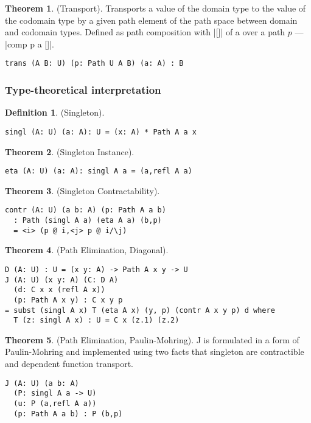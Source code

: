 \documentclass[twoside]{article}
\theoremstyle{definition}
\newtheorem{theorem}{Theorem}
\newtheorem{definition}{Definition}
\begin{document}
\begin{theorem} (Transport).
Transports a value of the domain type to the value of the codomain type
by a given path element of the path space between domain and codomain types.
Defined as path composition with |[]| of a over a path $p$ --- |comp p a []|.
\begin{lstlisting}
trans (A B: U) (p: Path U A B) (a: A) : B
\end{lstlisting}
\end{theorem}

\subsubsection*{Type-theoretical interpretation}
\begin{definition} (Singleton).
\begin{lstlisting}
singl (A: U) (a: A): U = (x: A) * Path A a x
\end{lstlisting}
\end{definition}

\begin{theorem} (Singleton Instance).
\begin{lstlisting}
eta (A: U) (a: A): singl A a = (a,refl A a)
\end{lstlisting}
\end{theorem}

\begin{theorem} (Singleton Contractability).
\begin{lstlisting}
contr (A: U) (a b: A) (p: Path A a b)
  : Path (singl A a) (eta A a) (b,p)
  = <i> (p @ i,<j> p @ i/\j)
\end{lstlisting}
\end{theorem}

\begin{theorem} (Path Elimination, Diagonal).
\begin{lstlisting}
D (A: U) : U = (x y: A) -> Path A x y -> U
J (A: U) (x y: A) (C: D A)
  (d: C x x (refl A x))
  (p: Path A x y) : C x y p
= subst (singl A x) T (eta A x) (y, p) (contr A x y p) d where
  T (z: singl A x) : U = C x (z.1) (z.2)
\end{lstlisting}
\end{theorem}

\begin{theorem} (Path Elimination, Paulin-Mohring).
J is formulated in a form of Paulin-Mohring and implemented using
two facts that singleton are contractible and dependent function
transport.
\begin{lstlisting}
J (A: U) (a b: A)
  (P: singl A a -> U)
  (u: P (a,refl A a))
  (p: Path A a b) : P (b,p)
\end{lstlisting}
\end{theorem}
\end{document}
